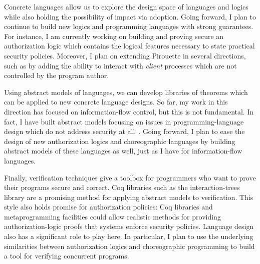 \documentclass{article}
\theoremstyle{definition}
\begin{document}
Concrete languages allow us to explore the design space of languages and logics while also holding the possibility of impact via adoption.
Going forward, I plan to continue to build new logics and programming languages with strong guarantees.
For instance, I am currently working on building and proving secure an authorization logic which contains the logical features necessary to state practical security policies.
Moreover, I plan on extending Pirouette in several directions, such as by adding the ability to interact with \emph{client} processes which are not controlled by the program author.

Using abstract models of languages, we can develop libraries of theorems which can be applied to new concrete language designs.
So far, my work in this direction has focused on information-flow control, but this is not fundamental.
In fact, I have built abstract models focusing on issues in programming-language design which do not address security at all~\citep{HirschT18}.
Going forward, I plan to ease the design of new authorization logics and choreographic languages by building abstract models of these languages as well, just as I have for information-flow languages.

Finally, verification techniques give a toolbox for programmers who want to prove their programs secure and correct.
Coq libraries such as the interaction-trees library are a promising method for applying abstract models to verification.
This style also holds promise for authorization policies: Coq libraries and metaprogramming facilities could allow realistic methods for providing authorization-logic proofs that systems enforce security policies.
Language design also has a significant role to play here.
In particular, I plan to use the underlying similarities between authorization logics and choreographic programming to build a tool for verifying concurrent programs.


\end{document}
